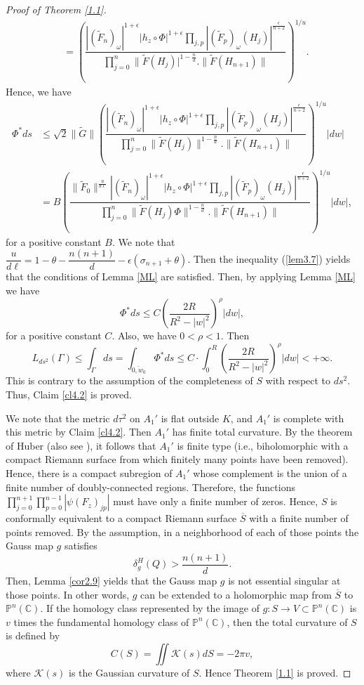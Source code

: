 \documentclass[12pt,article]{amsart}
\newcommand{\C}{{\mathbb{C}}}
\renewcommand{\P}{{\mathbb{P}}}
\numberwithin{equation}{section}
\begin{document}
\begin{proof}[Proof of Theorem \ref{1.1}]
\begin{align*}
&=\left (\dfrac{|(\tilde F_n)_{\omega}|^{1+\epsilon}|h_{z}\circ\Phi|^{1+\epsilon}\prod_{j,p}|(\tilde F_p)_\omega(H_j)|^{\frac{\epsilon}{n+2}}}{\prod_{j=0}^n\|\tilde F(H_j)|^{1-\frac{n}{d}}.\|\tilde F(H_{n+1})\|}\right)^{1/u}.
\end{align*}
Hence, we have
\begin{align*}
\Phi^*ds&\le\sqrt{2}\|\tilde G\|\left (\dfrac{|(\tilde F_n)_{\omega}|^{1+\epsilon}|h_{z}\circ\Phi|^{1+\epsilon}\prod_{j,p}|(\tilde F_p)_\omega(H_j)|^{\frac{\epsilon}{n+2}}}{\prod_{j=0}^n\|\tilde F(H_j)\|^{1-\frac{n}{d}}.\|\tilde F(H_{n+1})\|}\right)^{1/u}|dw|\\
&=B\left (\dfrac{\|\tilde F_0\|^{\frac{u}{d\ell}}|(\tilde F_n)_{\omega}|^{1+\epsilon}|h_{z}\circ\Phi|^{1+\epsilon}\prod_{j,p}|(\tilde F_p)_\omega(H_j)|^{\frac{\epsilon}{n+2}}}{\prod_{j=0}^n\|\tilde F(H_j)\Phi\|^{1-\frac{n}{d}}.\|\tilde F(H_{n+1})\|}\right)^{1/u}|dw|,
\end{align*}
for a positive constant $B$.
We note that $\dfrac{u}{d\ell}=1-\theta-\dfrac{n(n+1)}{d}-\epsilon(\sigma_{n+1}+\theta)$. Then the inequality (\ref{lem3.7}) yields that the conditions of Lemma \ref{ML} are satisfied. Then, by applying Lemma \ref{ML} we have
$$ \Phi^*ds\le C\left (\dfrac{2R}{R^2-|w|^2}\right)^\rho|dw|,$$
for a positive constant $C$. Also, we have $0<\rho<1$. Then
$$L_{ds^2}(\Gamma)\le\int_{\Gamma}ds=\int_{\overline{0,w_0}}\Phi^*ds\le C\cdot\int_{0}^R\left(\dfrac{2R}{R^2-|w|^2}\right)^{\rho}|dw|<+\infty. $$
This is contrary to the assumption of the completeness of $S$ with respect to $ds^2$. Thus, Claim \ref{cl4.2} is proved.

We note that the metric $d\tau^2$ on $A_1'$ is flat outside $K$, and $A_1'$ is complete with this metric by Claim \ref{cl4.2}. Then $A_1'$ has finite total curvature. By the theorem \cite[Theorem 13, p.61]{Hu61} of  Huber (also see \cite[Theorem 4.8]{Fu91}), it follows that $A_1'$ is finite type (i.e., biholomorphic with a compact Riemann surface from which finitely many points have been removed). Hence, there is a compact subregion of $A_1'$ whose complement is the union of a finite number of doubly-connected regions. Therefore, the functions $\prod_{j=0}^{n+1}\prod_{p=0}^{n-1}|\psi(F_z)_{jp}|$ must have only a finite number of zeros. Hence, $S$ is conformally equivalent to a compact Riemann surface $\overline{S}$ with a finite number of points removed. By the assumption, in a neighborhood of each of those points the Gauss map $g$ satisfies
$$ \delta_{g}^{H}(Q)> \dfrac{n(n+1)}{d}.$$
Then, Lemma \ref{cor2.9} yields that the Gauss map $g$ is not essential singular at those points. In other words, $g$ can be extended to a holomorphic map from $\overline{S}$ to $\P^n(\C)$. If the homology class represented by the image of $g:S\rightarrow V\subset\P^n(\C)$ is $v$ times the fundamental homology class of $\P^n(\C)$, then the total curvature of $S$ is defined by
$$C(S)=\iint\mathcal K(s)dS=-2\pi v,$$
where $\mathcal K(s)$ is the Gaussian curvature of $S$. Hence Theorem \ref{1.1} is proved.
\end{proof}
\end{document}
